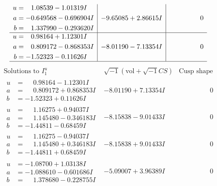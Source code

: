 \documentclass[1p]{elsarticle_modified}
\theoremstyle{definition}
\newcommand{\I}{\sqrt{-1}}
\begin{document}
$$\begin{array}{c|c|c}
\begin{aligned}
u &= \phantom{-}1.08539 - 1.01319 I \\
a &= -0.649568 - 0.696904 I \\
b &= \phantom{-}1.337990 - 0.293620 I\end{aligned}
 & -9.65085 + 2.86615 I & \phantom{-0.000000 } 0 \\ \hline\begin{aligned}
u &= \phantom{-}0.98164 + 1.12301 I \\
a &= \phantom{-}0.809172 - 0.868353 I \\
b &= -1.52323 - 0.11626 I\end{aligned}
 & -8.01190 - 7.13354 I & \phantom{-0.000000 } 0\\
 \hline 
 \end{array}$$\newpage$$\begin{array}{c|c|c}  
\text{Solutions to }I^u_{1}& \I (\text{vol} + \sqrt{-1}CS) & \text{Cusp shape}\\
 \hline 
\begin{aligned}
u &= \phantom{-}0.98164 - 1.12301 I \\
a &= \phantom{-}0.809172 + 0.868353 I \\
b &= -1.52323 + 0.11626 I\end{aligned}
 & -8.01190 + 7.13354 I & \phantom{-0.000000 } 0 \\ \hline\begin{aligned}
u &= \phantom{-}1.16275 + 0.94037 I \\
a &= \phantom{-}1.145480 - 0.346183 I \\
b &= -1.44811 - 0.68459 I\end{aligned}
 & -8.15838 - 9.01433 I & \phantom{-0.000000 } 0 \\ \hline\begin{aligned}
u &= \phantom{-}1.16275 - 0.94037 I \\
a &= \phantom{-}1.145480 + 0.346183 I \\
b &= -1.44811 + 0.68459 I\end{aligned}
 & -8.15838 + 9.01433 I & \phantom{-0.000000 } 0 \\ \hline\begin{aligned}
u &= -1.08700 + 1.03138 I \\
a &= -1.088610 - 0.601686 I \\
b &= \phantom{-}1.378680 - 0.228755 I\end{aligned}
 & -5.09007 + 3.96389 I & \phantom{-0.000000 } 0 \\ \hline\begin{aligned}

\end{aligned}
\end{array}$$
\end{document}
